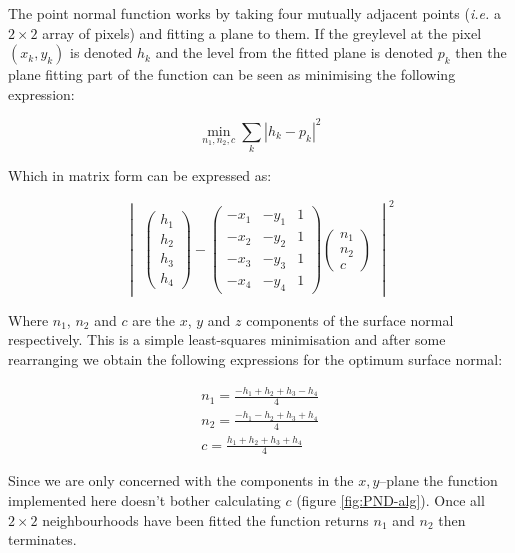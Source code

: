 \documentclass[11pt,a4paper]{article}
\begin{document}
\begin{multicols}{2}
		The point normal function works by taking four mutually adjacent points (\textit{i.e.} a $2 \times 2$ array of pixels) and fitting a plane to them. If the greylevel at the pixel $(x_k, y_k)$ is denoted $h_k$ and the level from the fitted plane is denoted $p_k$ then the plane fitting part of the function can be seen as minimising the following expression:

		\begin{equation}
			\min_{n_1, n_2, c} \sum_k |h_k - p_k|^2
		\end{equation}
		
		Which in matrix form can be expressed as:

		\begin{equation}
			\begin{vmatrix}
			\begin{pmatrix}
			h_1 \\
			h_2 \\
			h_3 \\
			h_4
			\end{pmatrix}
			-
			\begin{pmatrix}
			-x_1 & -y_1 & 1 \\
			-x_2 & -y_2 & 1 \\
			-x_3 & -y_3 & 1 \\
			-x_4 & -y_4 & 1
			\end{pmatrix}
			\begin{pmatrix}
			n_1 \\
			n_2 \\
			c
			\end{pmatrix}
			\end{vmatrix}^2
		\end{equation}

		Where $n_1$, $n_2$ and $c$ are the $x$, $y$ and $z$ components of the surface normal respectively. This is a simple least-squares minimisation and after some rearranging we obtain the following expressions for the optimum surface normal:

		\begin{equation}
		\begin{split}
			n_1 = \frac{-h_1 + h_2 + h_3 - h_4}{4} \\
			n_2 = \frac{-h_1 - h_2 + h_3 + h_4}{4} \\
			c = \frac{h_1 + h_2 + h_3 + h_4}{4}
		\end{split}
		\end{equation}

		Since we are only concerned with the components in the $x,y$--plane the function implemented here doesn't bother calculating $c$ (figure \ref{fig:PND-alg}). Once all $2 \times 2$ neighbourhoods have been fitted the function returns $n_1$ and $n_2$ then terminates.


\end{multicols}
\end{document}
